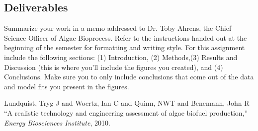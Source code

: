 \documentclass[12pt,letterpaper]{article}
\begin{document}
\subsection *{Deliverables}


Summarize your work in a memo addressed to Dr. Toby Ahrens, the Chief Science Officer of Algae Bioprocess.  Refer to the instructions handed out at the beginning of the semester for  formatting and writing style.  For this assignment include the following sections: (1) Introduction, (2) Methods,(3) Results and Discussion (this is where you'll include the figures you created), and (4) Conclusions.  Make sure you to only include conclusions that come out of the data and model fits you present in the figures.\\



\begin{thebibliography}{9}


Lundquist, Tryg J and Woertz, Ian C and Quinn, NWT and Benemann, John R
 ``A realistic technology and engineering assessment of algae biofuel production,''
  \emph{Energy Biosciences Institute}, 2010.


\end{thebibliography}
\end{document}
